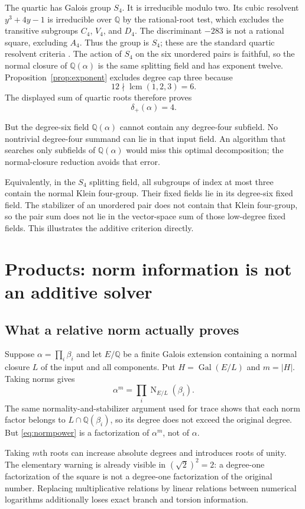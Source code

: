 \documentclass[11pt,letterpaper]{article}
\theoremstyle{definition}
\newcommand{\Q}{\mathbb Q}
\newcommand{\Gal}{\operatorname{Gal}}
\newcommand{\Nm}{\operatorname{N}}
\newcommand{\lcm}{\operatorname{lcm}}
\newcommand{\dplus}{\delta_{+}}
\begin{document}
The quartic has Galois group $S_4$. It is irreducible modulo two. Its cubic resolvent $y^3+4y-1$ is irreducible over $\Q$ by the rational-root test, which excludes the transitive subgroups $C_4$, $V_4$, and $D_4$. The discriminant $-283$ is not a rational square, excluding $A_4$. Thus the group is $S_4$; these are the standard quartic resolvent criteria \cite{milne}. The action of $S_4$ on the six unordered pairs is faithful, so the normal closure of $\Q(\alpha)$ is the same splitting field and has exponent twelve. Proposition~\ref{prop:exponent} excludes degree cap three because
\[
 12\nmid\lcm(1,2,3)=6.
\]
The displayed sum of quartic roots therefore proves
\[
 \dplus(\alpha)=4.
\]

But the degree-six field $\Q(\alpha)$ cannot contain any degree-four subfield. No nontrivial degree-four summand can lie in that input field. An algorithm that searches only subfields of $\Q(\alpha)$ would miss this optimal decomposition; the normal-closure reduction avoids that error.

Equivalently, in the $S_4$ splitting field, all subgroups of index at most three contain the normal Klein four-group. Their fixed fields lie in its degree-six fixed field. The stabilizer of an unordered pair does not contain that Klein four-group, so the pair sum does not lie in the vector-space sum of those low-degree fixed fields. This illustrates the additive criterion directly.

\section{Products: norm information is not an additive solver}
\subsection{What a relative norm actually proves}
Suppose $\alpha=\prod_i\beta_i$ and let $E/\Q$ be a finite Galois extension containing a normal closure $L$ of the input and all components. Put $H=\Gal(E/L)$ and $m=|H|$. Taking norms gives
\begin{equation}\label{eq:normpower}
 \alpha^m=\prod_i\Nm_{E/L}(\beta_i).
\end{equation}
The same normality-and-stabilizer argument used for trace shows that each norm factor belongs to $L\cap\Q(\beta_i)$, so its degree does not exceed the original degree. But \eqref{eq:normpower} is a factorization of $\alpha^m$, not of $\alpha$.

Taking $m$th roots can increase absolute degrees and introduces roots of unity. The elementary warning is already visible in $(\sqrt2)^2=2$: a degree-one factorization of the square is not a degree-one factorization of the original number. Replacing multiplicative relations by linear relations between numerical logarithms additionally loses exact branch and torsion information.
\end{document}
